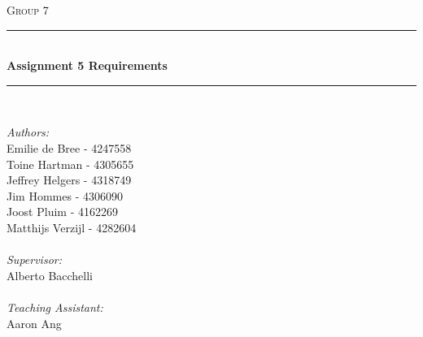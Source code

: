 \begin{titlepage}

\newcommand{\HRule}{\rule{\linewidth}{0.5mm}} %

\center %
 

\textsc{\LARGE Group 7}\\[1.5cm] %


\HRule \\[0.4cm]
{ \huge \bfseries Assignment 5 Requirements}\\[0.4cm] %
\HRule \\[4cm]
 

\begin{minipage}{0.5\textwidth}
\emph{Authors:}\\     
Emilie de Bree - 4247558\\
Toine Hartman - 4305655\\
Jeffrey Helgers - 4318749 \\
Jim Hommes - 4306090\\
Joost Pluim - 4162269 \\
Matthijs Verzijl - 4282604\\\\
\emph{Supervisor:} \\
Alberto Bacchelli \\\\
\emph{Teaching Assistant:} \\
Aaron Ang\\
\end{minipage}\\[4cm]




\end{titlepage}
